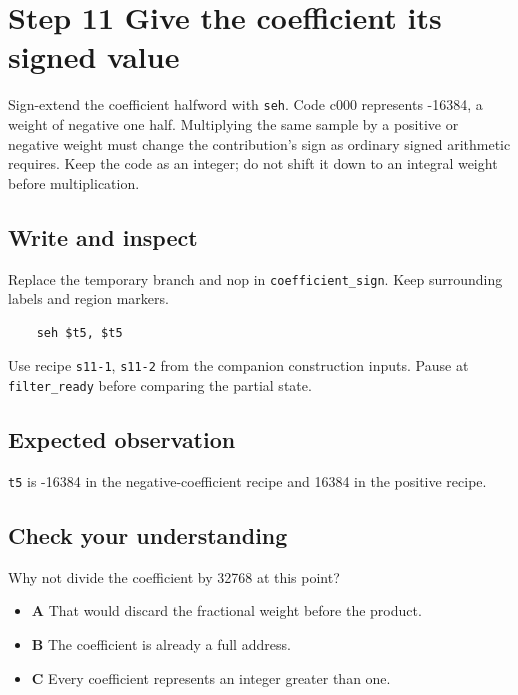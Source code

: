 \section{Step 11 Give the coefficient its signed value}\label{fir-s11}

Sign-extend the coefficient halfword with \texttt{seh}. Code c000 represents -16384, a weight of negative one half. Multiplying the same sample by a positive or negative weight must change the contribution’s sign as ordinary signed arithmetic requires. Keep the code as an integer; do not shift it down to an integral weight before multiplication.

\subsection{Write and inspect}
Replace the temporary branch and nop in \texttt{coefficient\_sign}. Keep surrounding labels and region markers.

\begin{verbatim}
    seh $t5, $t5
\end{verbatim}
Use recipe \texttt{s11-1}, \texttt{s11-2} from the companion construction inputs. Pause at \texttt{filter\_ready} before comparing the partial state.

\subsection{Expected observation}
\texttt{t5} is -16384 in the negative-coefficient recipe and 16384 in the positive recipe.

\subsection{Check your understanding}
Why not divide the coefficient by 32768 at this point?

\begin{itemize}
  \item \textbf{A} That would discard the fractional weight before the product.
  \item \textbf{B} The coefficient is already a full address.
  \item \textbf{C} Every coefficient represents an integer greater than one.
\end{itemize}
